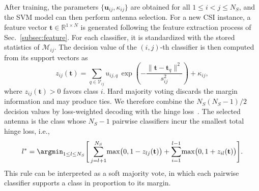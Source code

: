 {After training, the parameters $\{\mathbf{u}_{ij},\kappa_{ij}\}$ are
obtained for all $1\leq i<j\leq N_S$, and the SVM model can then perform
antenna selection. For a new CSI instance, a feature vector
$\mathbf{t}\in \mathbb{R}^{1\times N}$ is generated following the feature
extraction process of Sec.~\ref{subsec:feature}. For each classifier, it
is standardized with the stored statistics of $\mathcal{M}_{ij}$. The
decision value of the $(i,j)$-th classifier is then computed from its
support vectors as
\begin{equation}\label{eq:SVM_dec}
z_{ij}(\mathbf{t}) = \sum_{q\in\mathcal{V}_{ij}} u_{ij,q}\,
\exp\!\left(-\frac{\|\mathbf{t}-\mathbf{t}_q\|^2}{s_{ij}^2}\right) + \kappa_{ij},
\end{equation}
where $z_{ij}(\mathbf{t})>0$ favors class $i$. Hard majority voting
discards the margin information and may produce ties. We therefore
combine the $N_S(N_S-1)/2$ decision values by loss-weighted decoding with
the hinge loss~\cite{Escalera_2010_TPAMI}. The selected antenna is the
class whose $N_S-1$ pairwise classifiers incur the smallest total hinge
loss, i.e.,
\begin{equation}\label{eq:SVM_decision}
l^{\ast} = \argmin_{1\leq l \leq N_S}
\Bigg[\sum_{j=l+1}^{N_S}\!\max\!\big(0,1-z_{lj}(\mathbf{t})\big)
+\sum_{i=1}^{l-1}\!\max\!\big(0,1+z_{il}(\mathbf{t})\big)\Bigg].
\end{equation}
This rule can be interpreted as a soft majority vote, in which each
pairwise classifier supports a class in proportion to its margin.
}


